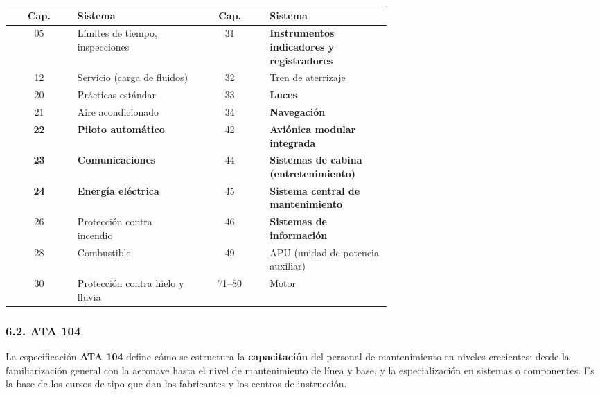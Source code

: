 \begin{center}
\small
\begin{tabular}{|c|p{0.32\linewidth}||c|p{0.32\linewidth}|}
\hline
\textbf{Cap.} & \textbf{Sistema} & \textbf{Cap.} & \textbf{Sistema} \\ \hline
05 & Límites de tiempo, inspecciones & 31 & \textbf{Instrumentos indicadores y registradores} \\
\hline
12 & Servicio (carga de fluidos) & 32 & Tren de aterrizaje \\ \hline
20 & Prácticas estándar & 33 & \textbf{Luces} \\ \hline
21 & Aire acondicionado & 34 & \textbf{Navegación} \\ \hline
\textbf{22} & \textbf{Piloto automático} & 42 & \textbf{Aviónica modular integrada} \\ \hline
\textbf{23} & \textbf{Comunicaciones} & 44 & \textbf{Sistemas de cabina (entretenimiento)} \\
\hline
\textbf{24} & \textbf{Energía eléctrica} & 45 & \textbf{Sistema central de mantenimiento} \\ \hline
26 & Protección contra incendio & 46 & \textbf{Sistemas de información} \\ \hline
28 & Combustible & 49 & APU (unidad de potencia auxiliar) \\ \hline
30 & Protección contra hielo y lluvia & 71--80 & Motor \\ \hline
\end{tabular}
\end{center}

\subsubsection*{6.2. ATA 104}
La especificación \textbf{ATA 104} define cómo se estructura la \textbf{capacitación} del personal
de mantenimiento en niveles crecientes: desde la familiarización general con la aeronave hasta
el nivel de mantenimiento de línea y base, y la especialización en sistemas o componentes. Es la
base de los cursos de tipo que dan los fabricantes y los centros de instrucción.

